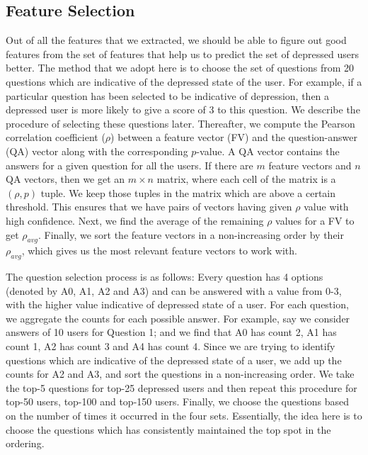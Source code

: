\subsection{Feature Selection}
\label{sec:featuresel}
Out of all the features that we extracted, we should be able to figure out good features from the set of features that help us to predict the set of depressed users better. The method that we adopt here is to choose the set of questions from 20 questions which are indicative of the depressed state of the user. For example, if a particular question has been selected to be indicative of depression, then a depressed user is more likely to give a score of 3 to this question. We describe the procedure of selecting these questions later. Thereafter, we compute the Pearson correlation coefficient ($\rho$) between a feature vector (FV) and the question-answer (QA) vector along with the corresponding $p$-value. A QA vector contains the answers for a given question for all the users. If there are $m$ feature vectors and $n$ QA vectors, then we get an $m\times n$ matrix, where each cell of the matrix is a $(\rho, p)$ tuple. We keep those tuples in the matrix which are above a certain threshold. This ensures that we have pairs of vectors having given $\rho$ value with high confidence. Next, we find the average of the remaining $\rho$ values for a FV to get $\rho_{avg}$. Finally, we sort the feature vectors in a non-increasing order by their $\rho_{avg}$, which gives us the most relevant feature vectors to work with.

The question selection process is as follows: Every question has 4 options (denoted by A0, A1, A2 and A3) and can be answered with a value from 0-3, with the higher value indicative of depressed state of a user. For each question, we aggregate the counts for each possible answer. For example, say we consider answers of 10 users for Question 1; and we find that A0 has count 2, A1 has count 1, A2 has count 3 and A4 has count 4. Since we are trying to identify questions which are indicative of the depressed state of a user, we add up the counts for A2 and A3, and sort the questions in a non-increasing order. We take the top-5 questions for top-25 depressed users and then repeat this procedure for top-50 users, top-100 and top-150 users. Finally, we choose the questions based on the number of times it occurred in the four sets. Essentially, the idea here is to choose the questions which has consistently maintained the top spot in the ordering.







